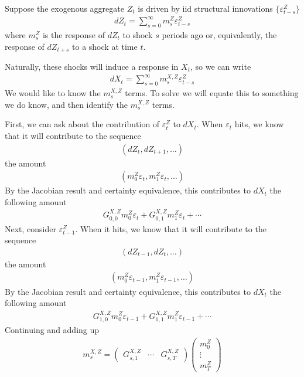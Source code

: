 \documentclass[12pt]{article}
\theoremstyle{plain}
\theoremstyle{definition}
\theoremstyle{remark}
\begin{document}
\clearpage
Suppose the exogenous aggregate $Z_t$ is driven by iid structural
innovations $\{\varepsilon_{t-s}^Z\}$
\begin{align*}
  dZ_t
  =
  \sum_{s=0}^\infty
  m_s^Z \varepsilon_{t-s}^Z
\end{align*}
where $m_s^Z$ is the response of $dZ_t$ to shock $s$ periods ago or,
equivalently, the response of $dZ_{t+s}$ to a shock at time $t$.

Naturally, these shocks will induce a response in $X_t$, so we can write
\begin{align*}
  dX_t
  =
  \sum_{s=0}^\infty
  m_s^{X,Z} \varepsilon_{t-s}^Z
\end{align*}
We would like to know the $m_s^{X,Z}$ terms.
To solve we will equate this to something we do know, and then identify
the $m_s^{X,Z}$ terms.

First, we can ask about the contribution of $\varepsilon_t^Z$ to $dX_t$.
When $\varepsilon_t$ hits, we know that it will contribute to
the sequence
\begin{align*}
  (dZ_t,dZ_{t+1},\ldots)
\end{align*}
the amount
\begin{align*}
  (m_0^Z\varepsilon_t,m_1^Z\varepsilon_t,\ldots)
\end{align*}
By the Jacobian result and certainty equivalence, this contributes to
$dX_t$ the following amount
\begin{align*}
  G_{0,0}^{X,Z}m_0^Z\varepsilon_t
  +
  G_{0,1}^{X,Z}m_1^Z\varepsilon_t
  +
  \cdots
\end{align*}
Next, consider $\varepsilon_{t-1}^Z$.
When it hits, we know that it will contribute to the sequence
\begin{align*}
  (dZ_{t-1},dZ_{t},\ldots)
\end{align*}
the amount
\begin{align*}
  (m_0^Z\varepsilon_{t-1},m_1^Z\varepsilon_{t-1},\ldots)
\end{align*}
By the Jacobian result and certainty equivalence, this contributes to
$dX_t$ the following amount
\begin{align*}
  G_{1,0}^{X,Z}m_0^Z\varepsilon_{t-1}
  +
  G_{1,1}^{X,Z}m_1^Z\varepsilon_{t-1}
  +
  \cdots
\end{align*}
Continuing and adding up
\begin{align*}
  m_s^{X,Z}
  =
  \begin{pmatrix}
    G_{s,1}^{X,Z}
    & \cdots &
    G_{s,T}^{X,Z}
  \end{pmatrix}
  \begin{pmatrix}
    m_0^Z \\ \vdots \\ m_T^Z
  \end{pmatrix}
\end{align*}
\end{document}
